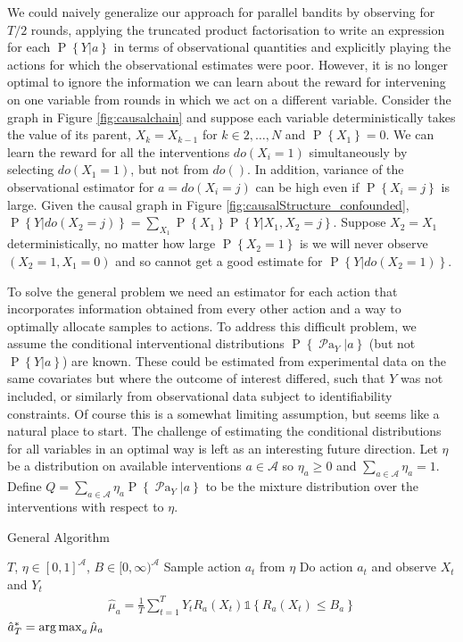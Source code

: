\documentclass[11pt,a4paper,oneside]{book}
\newcommand{\calA}{\mathcal A}
\newcommand{\set}[1]{\left\{#1\right\}}
\newcommand{\ind}[1]{\mathds{1}\!\!\set{#1}}
\newcommand{\argmax}{\operatornamewithlimits{arg\,max}}
\newcommand{\eq}[1]{\begin{align*}#1\end{align*}}
\renewcommand{\P}[1]{\operatorname{P}\left\{#1\right\}}
\newcommand{\parents}[1]{\operatorname{\mathcal{P}a}_{#1}}
\theoremstyle{plain}
\theoremstyle{definition}
\begin{document}
We could naively generalize our approach for parallel bandits by observing for $T/2$ rounds, applying the truncated product factorisation to 
write an expression for each $\P{Y|a}$ in terms of observational quantities and explicitly playing the actions for which the observational 
estimates were poor. However, it is no longer optimal to ignore the information we can learn about the reward for intervening on one variable 
from rounds in which we act on a different variable. Consider the graph in Figure \ref{fig:causalchain} and suppose each variable deterministically 
takes the value of its parent, $X_k = X_{k-1}$ for $k\in {2,\ldots,N}$ and $\P{X_1} = 0$. We can learn the reward for all the interventions $do(X_i = 1)$ 
simultaneously by selecting $do(X_1 = 1)$, but not from $do()$. In addition, variance of the observational estimator for $a = do(X_i = j)$ can be 
high even if $\P{X_i = j}$ is large. Given the causal graph in Figure \ref{fig:causalStructure_confounded}, $\P{Y|do(X_2= j)} = \sum_{X_1}\P{X_1}\P{Y|X_1, X_2 = j}$. 
Suppose $X_2 = X_1$ deterministically, no matter how large $\P{X_2 = 1}$ is we will never observe $(X_2=1,X_1 = 0)$ and so cannot 
get a good estimate for $\P{Y|do(X_2=1)}$. 

To solve the general problem we need an estimator for each action that incorporates information obtained from every other action and a way to optimally 
allocate samples to actions. To address this difficult problem, we assume the conditional interventional distributions $\P{\parents{Y}|a}$ (but not $\P{Y|a}$) 
are known. These could be estimated from experimental data on the same covariates but where the outcome of interest differed, such that $Y$ was not included, 
or similarly from observational data subject to identifiability constraints. Of course this is a somewhat limiting assumption, but seems like a natural place to
start. The challenge of estimating the conditional distributions for all variables in an optimal way is left as an interesting future direction.
Let $\eta$ be a distribution on available interventions $a \in \calA$ so $\eta_a \geq 0$ and $\sum_{a \in \calA} \eta_a = 1$. 
Define $Q = \sum_{a \in \calA} \eta_a \P{\parents{Y}|a}$ to be the mixture distribution over the interventions with respect to $\eta$.



\begin{algorithm}[H]
\caption{General Algorithm}\label{alg:general}
\begin{algorithmic}
 $T$, $\eta \in [0,1]^{\calA}$, $B \in [0,\infty)^{\calA}$
\FOR{$t \in \set{1,\ldots,T}$}
\STATE Sample action $a_t$ from $\eta$
\STATE Do action $a_t$ and observe $X_t$ and $Y_t$
\ENDFOR
\FOR{$a \in \calA$}
\STATE
\eq {
\hat \mu_a =  \frac{1}{T} \sum_{t=1}^T Y_t R_a(X_t)  \ind{R_a(X_t) \leq B_a}
}
\ENDFOR
{} $\hat a^*_T = \argmax_a \hat \mu_a$
\end{algorithmic}
\end{algorithm}
\end{document}
